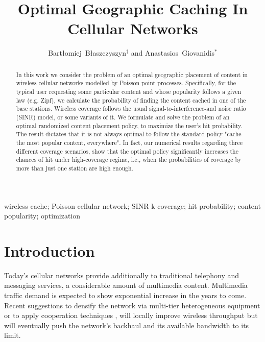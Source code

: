\documentclass[conference,twocolum,final]{IEEEtran}
\begin{document}
\title{Optimal Geographic Caching In Cellular Networks}

\author{Bart{\l}omiej~B{\l}aszczyszyn$^\dagger$ and Anastasios~Giovanidis$^\ast$\\[2ex]}


\maketitle

\begin{abstract}
In this work we consider the problem of an optimal geographic placement of content  in wireless cellular networks modelled by Poisson point processes. Specifically, for the typical user requesting some particular content and whose popularity follows a given law (e.g. Zipf),  we calculate the probability of finding the content cached in one of the base stations. Wireless coverage follows the usual signal-to-interference-and noise ratio (SINR) model, or some variants of it.  We formulate and solve the problem of an optimal randomized content placement policy, to maximize the user's hit probability. The result dictates that it is not always optimal to follow the standard policy "cache the most popular content, everywhere". In fact, our numerical results regarding three different coverage scenarios, show that  
the optimal policy significantly increases the chances of hit under high-coverage regime, i.e., when  the probabilities of coverage by more than just one station are high enough.
\end{abstract}

\begin{keywords}
wireless cache; Poisson cellular network; SINR k-coverage; hit probability; content popularity; optimization \end{keywords}

\let\thefootnote\relax{}
\newcommand{\thefootnote}{\arabic{footnote}}

\section{Introduction}

Today's cellular networks provide additionally to 
traditional telephony and messaging services, a considerable amount of multimedia content. Multimedia traffic demand is expected to show exponential increase in the years to come. Recent suggestions to densify the network via multi-tier heterogeneous equipment or to apply cooperation techniques \cite{BacGiov13}, will locally improve wireless throughput but will eventually push the network's backhaul and its available bandwidth to its limit. 
\end{document}
